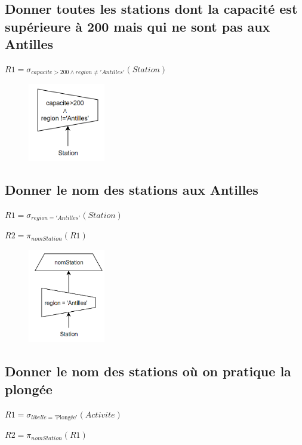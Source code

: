 \documentclass{article}
\begin{document}
\subsection{Donner toutes les stations dont la capacité est supérieure à 200 mais qui ne sont pas aux Antilles}

$ R1 = \sigma_{capacite > 200 \wedge region \neq 'Antilles'}(Station)$

\begin{figure}[H]
  \centering
  \includegraphics[width=0.3\textwidth]{imgAlgGraph/6.png}
  \label{fig:6}
\end{figure}

\subsection{Donner le nom des stations aux Antilles}

$ R1 = \sigma_{region = 'Antilles'}(Station)$

$ R2 = \pi_{nomStation}(R1)$

\begin{figure}[H]
  \centering
  \includegraphics[width=0.3\textwidth]{imgAlgGraph/7.png}
  \label{fig:7}
\end{figure}

\subsection{Donner le nom des stations où on pratique la plongée}

$ R1 = \sigma_{libelle = \text{'Plongée'}}(Activite)$

$ R2 = \pi_{nomStation}(R1)$
\end{document}
